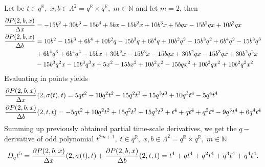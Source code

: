 \begin{examp}
    \label{time_scale_qn_example_2}
    Let be $t\in q^{\mathbb{R}}, \; x,b\in \Lambda^2 = q^{\mathbb{R}} \times q^{\mathbb{R}}, \; m\in\mathbb{N}$ and let $m=2$, then
    \begin{align*}
        \frac{\partial P ( 2, b, x )}{\Delta x}
        &= -15 b^2 + 30 b^3 - 15 b^4 + 5 b x - 15 b^2 x + 10 b^3 x + 5 b q x - 15 b^2 q x + 10 b^3 q x \\
        \frac{\partial P ( 2, b, x )}{\Delta b}
        &= 10 b^2 - 15 b^3 + 6 b^4 + 10 b^2 q - 15 b^3 q + 6 b^4 q
        + 10 b^2 q^2 - 15 b^3 q^2 + 6 b^4 q^2 - 15 b^3 q^3 \\
        &+ 6 b^4 q^3 + 6 b^4 q^4 - 15 b x + 30 b^2 x - 15 b^3 x - 15 b q x + 30 b^2 q x
        - 15 b^3 q x + 30 b^2 q^2 x \\
        &- 15 b^3 q^2 x - 15 b^3 q^3 x + 5 x^2 - 15 b x^2 + 10 b^2 x^2 - 15 b q x^2 + 10 b^2 q x^2 + 10 b^2 q^2 x^2
    \end{align*}
    Evaluating in points yields
    \begin{align*}
        &\frac{\partial P ( 2, b, x )}{\Delta x} (2, \sigma(t), t)
        = 5 q t^2 - 10 q^2 t^2 - 15 q^2 t^3 + 15 q^3 t^3 + 10 q^3 t^4 - 5 q^4 t^4 \\
        &\frac{\partial P ( 2, b, x )}{\Delta b} (2, t, t)
        = -5 q t^2 + 10 q^2 t^2 + 15 q^2 t^3 - 15 q^3 t^3 + t^4 + q t^4 + q^2 t^4 - 9 q^3 t^4 + 6 q^4 t^4
    \end{align*}
    Summing up previously obtained partial time-scale derivatives, we get the $q-$derivative of odd polynomial
    $t^{2m+1}, \; t\in q^{\mathbb{R}}, \; x,b\in \Lambda^2 = q^{\mathbb{R}} \times q^{\mathbb{R}}, \; m\in\mathbb{N}$
    \begin{align*}
        D_{q} t^{5}
        = \frac{\partial P ( 2, b, x )}{\Delta x} (2, \sigma(t), t)
        + \frac{\partial P ( 2, b, x )}{\Delta b} (2, t, t)
        = t^4 + q t^4 + q^2 t^4 + q^3 t^4 + q^4 t^4.
    \end{align*}
\end{examp}
